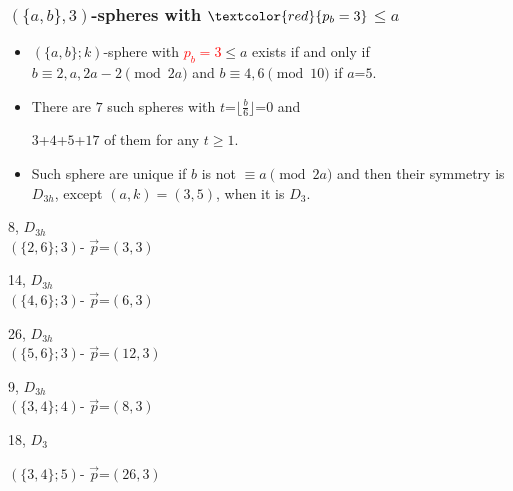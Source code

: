 \documentclass{beamer}
\begin{document}
\begin{frame}\frametitle{$(\{a,b\},3)$-spheres with
$\textcolor{red}{p_b=3}$$\le a$}
\vspace{3mm}
\begin{itemize}

\item   $(\{a,b\};k)$-sphere with \textcolor{red}{$p_b=3$}$\le a$ exists
if and only if
$b\equiv 2,a,2a-2 \pmod{2a}$ and  $b\equiv 4,6 \pmod{10}$
if $a$=$5$.
 

\item There are $7$ such spheres with $t$=$\lfloor{\frac{b}{6}}\rfloor$=$0$
and 

$3$+$4$+$5$+$17$ of them for any $t\ge 1$.
\item  Such sphere are unique if $b$ is not
$\equiv a \pmod{2a}$ and then their symmetry is $D_{3h}$, except
$(a,k)=(3,5)$,
 when it is $D_3$.
 



\end{itemize}

\begin{center}
\begin{minipage}[b]{19mm}
\centering
{}\par
8, $D_{3h}$\\
$(\{2,6\};3)$-
$\vec{p}$=$(3,3)$
\end{minipage}
\begin{minipage}[b]{19mm}
\centering
{}\par
14, $D_{3h}$\\
 $(\{4,6\};3)$-
  $\vec{p}$=$(6,3)$ 
 \end{minipage}
 \begin{minipage}[b]{19mm}
\centering
{}\par
26,  $D_{3h}$\\ $(\{5,6\};3)$- 
$\vec{p}$=$(12,3)$\end{minipage}
\begin{minipage}[b]{19mm}
\centering
{}\par
9, $D_{3h}$ \\
 $(\{3,4\};4)$-
 $\vec{p}$=$(8,3)$\end{minipage}
\begin{minipage}[b]{20mm}
\centering
{}\par
 18, $D_{3}$\par
 $(\{3,4\};5)$-
 $\vec{p}$=$(26,3)$ \end{minipage} 
 
 
 \end{center}
 \end{frame}     
\end{document}
